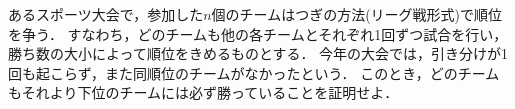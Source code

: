 \documentclass[../../main.tex]{subfiles}
\begin{document}
あるスポーツ大会で，参加した$n$個のチームはつぎの方法(リーグ戦形式)で順位を争う．
すなわち，どのチームも他の各チームとそれぞれ1回ずつ試合を行い，勝ち数の大小によって順位をきめるものとする．
今年の大会では，引き分けが1回も起こらず，また同順位のチームがなかったという．
このとき，どのチームもそれより下位のチームには必ず勝っていることを証明せよ．
\end{document}
